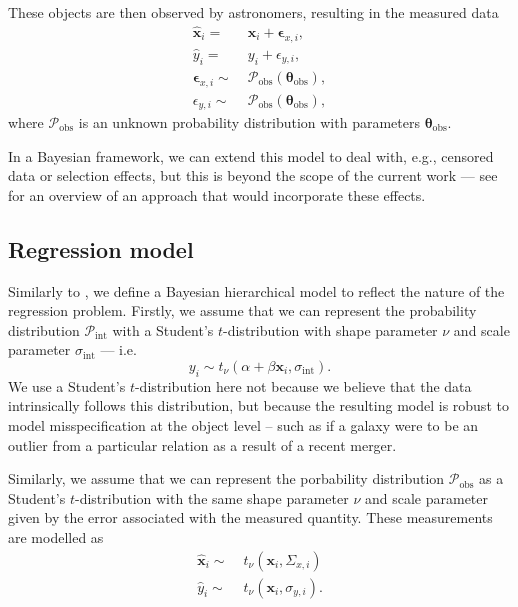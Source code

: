 \documentclass[fleqn,usenatbib]{mnras}
\newcommand{\studentt}[2]{t_\nu \left( #1, #2 \right)}
\newcommand{\depvar}{y_i}
\newcommand{\indepvars}{\boldsymbol{x}_i}
\newcommand{\obsdep}{\hat{y}_i}
\newcommand{\obsindep}{\hat{\boldsymbol{x}}_i}
\newcommand{\indepcov}{\Sigma_{x, i}}
\newcommand{\deperr}{\sigma_{y, i}}
\newcommand{\intscttr}{\sigma_{\text{int}}}
\newcommand{\intercept}{\alpha}
\newcommand{\covariate}{\beta}
\begin{document}
These objects are then observed by astronomers, resulting in the measured
data
\begin{align}
    \hat{\boldsymbol{x}}_i =&\; \boldsymbol{x}_i + \boldsymbol{\epsilon}_{x,i}, \\
    \hat{y}_i =&\; y_i + \epsilon_{y,i}, \\
    \boldsymbol{\epsilon}_{x,i} \sim&\; \mathcal{P}_{\text{obs}} \left( \boldsymbol{\theta}_{\text{obs}} \right), \\
    \epsilon_{y,i} \sim&\; \mathcal{P}_{\text{obs}} \left( \boldsymbol{\theta}_{\text{obs}} \right),
\end{align}
where $\mathcal{P}_{\text{obs}}$ is an unknown probability distribution with
parameters $\boldsymbol{\theta}_{\text{obs}}$.

In a Bayesian framework, we can extend this model to deal with, e.g., censored
data or selection effects, but this is beyond the scope of the current work ---
see \citet{Kelly:2007} for an overview of an approach that would incorporate
these effects.

\subsection{Regression model}
\label{sec:formalism.model}

Similarly to \citet{Kelly:2007}, we define a Bayesian hierarchical model to
reflect the nature of the regression problem. Firstly, we assume that we can
represent the probability distribution $\mathcal P_{\text{int}}$ with a
Student's $t$-distribution with shape parameter $\nu$ and scale parameter
$\sigma_{\text{int}}$ --- i.e.
\begin{equation}
\depvar \sim \studentt{\intercept + \covariate \indepvars}{\intscttr}.
\end{equation}
We use a Student's $t$-distribution here not because we believe that the data
intrinsically follows this distribution, but because the resulting model is
robust to model misspecification at the object level -- such as if a galaxy were
to be an outlier from a particular relation as a result of a recent merger.

Similarly, we assume that we can represent the porbability distribution
$\mathcal P_{\text{obs}}$ as a Student's $t$-distribution with the same shape
parameter $\nu$ and scale parameter given by the error associated with the
measured quantity. These measurements are modelled as
\begin{align}
    \obsindep \sim&\; \studentt{\indepvars}{\indepcov} \\
    \obsdep \sim&\; \studentt{\indepvars}{\deperr}.
\end{align}
\end{document}

